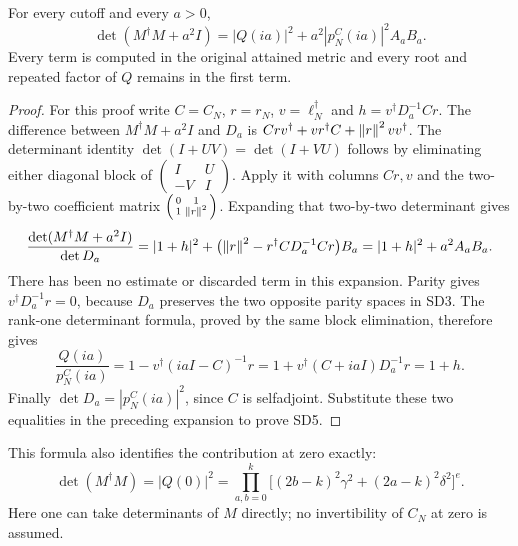 \begin{osdtheorem}
For every cutoff and every $a>0$,
\begin{equation}\tag{SD5}
\boxed{\det(M^\dagger M+a^2I)
=|Q(ia)|^2+a^2|p_N^C(ia)|^2 A_aB_a.}
\end{equation}
Every term is computed in the original attained metric and every root
and repeated factor of $Q$ remains in the first term.
\end{osdtheorem}
\begin{proof}
For this proof write $C=C_N$, $r=r_N$, $v=\ell_N^\dagger$ and
$h=v^\dagger D_a^{-1}Cr$. The difference between $M^\dagger M+a^2I$
and $D_a$ is
$Crv^\dagger+vr^\dagger C+\left\lVert r\right\rVert^2vv^\dagger$.
The determinant identity $\det(I+UV)=\det(I+VU)$ follows by eliminating
either diagonal block of $\left(\begin{smallmatrix}I&U\\-V&I\end{smallmatrix}\right)$.
Apply it with columns $Cr,v$ and the two-by-two coefficient matrix
$\left(\begin{smallmatrix}0&1\\1&\left\lVert r\right\rVert^2\end{smallmatrix}\right)$.
Expanding that two-by-two determinant gives
\[
\frac{\det(M^\dagger M+a^2I)}{\det D_a}
=|1+h|^2+
\bigl(\left\lVert r\right\rVert^2-r^\dagger CD_a^{-1}Cr\bigr)B_a
=|1+h|^2+a^2A_aB_a.
\]
There has been no estimate or discarded term in this expansion.
Parity gives $v^\dagger D_a^{-1}r=0$, because $D_a$ preserves the two
opposite parity spaces in SD3. The rank-one determinant formula,
proved by the same block elimination, therefore gives
\[
\frac{Q(ia)}{p_N^C(ia)}
=1-v^\dagger(iaI-C)^{-1}r
=1+v^\dagger(C+iaI)D_a^{-1}r=1+h.
\]
Finally $\det D_a=|p_N^C(ia)|^2$, since $C$ is selfadjoint. Substitute
these two equalities in the preceding expansion to prove SD5.
\end{proof}

This formula also identifies the contribution at zero exactly:
\begin{equation}\tag{SD6}
\det(M^\dagger M)=|Q(0)|^2
=\prod_{a,b=0}^k\bigl[(2b-k)^2\gamma^2+(2a-k)^2\delta^2\bigr]^e.
\end{equation}
Here one can take determinants of $M$ directly; no invertibility of
$C_N$ at zero is assumed.

